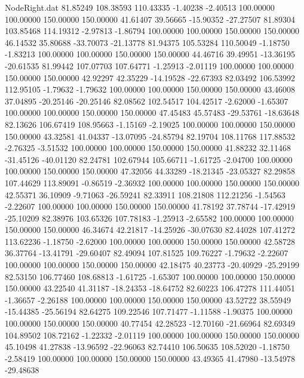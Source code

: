 \begin{filecontents}{NodeRight.dat}
  81.85249  108.38593  110.43335    -1.40238   -2.40513  100.00000  100.00000  150.00000  150.00000   41.61407   39.56665  -15.90352  -27.27507
  81.89304  103.85468  114.19312    -2.97813   -1.86794  100.00000  100.00000  150.00000  150.00000   46.14532   35.80688  -33.70073  -21.13778
  81.94375  105.53284  110.50049    -1.18750   -1.83213  100.00000  100.00000  150.00000  150.00000   44.46716   39.49951  -13.36195  -20.61535
  81.99442  107.07703  107.64771    -1.25913   -2.01119  100.00000  100.00000  150.00000  150.00000   42.92297   42.35229  -14.19528  -22.67393
  82.03492  106.53992  112.95105    -1.79632   -1.79632  100.00000  100.00000  150.00000  150.00000   43.46008   37.04895  -20.25146  -20.25146
  82.08562  102.54517  104.42517    -2.62000   -1.65307  100.00000  100.00000  150.00000  150.00000   47.45483   45.57483  -29.53761  -18.63648
  82.13626  106.67419  108.95663    -1.15169   -2.19025  100.00000  100.00000  150.00000  150.00000   43.32581   41.04337  -13.07095  -24.85794
  82.19704  108.11768  117.88532    -2.76325   -3.51532  100.00000  100.00000  150.00000  150.00000   41.88232   32.11468  -31.45126  -40.01120
  82.24781  102.67944  105.66711    -1.61725   -2.04700  100.00000  100.00000  150.00000  150.00000   47.32056   44.33289  -18.21345  -23.05327
  82.29858  107.44629  113.89091    -0.86519   -2.36932  100.00000  100.00000  150.00000  150.00000   42.55371   36.10909   -9.71063  -26.59241
  82.33911  108.21808  112.21256    -1.54563   -2.22607  100.00000  100.00000  150.00000  150.00000   41.78192   37.78744  -17.42919  -25.10209
  82.38976  103.65326  107.78183    -1.25913   -2.65582  100.00000  100.00000  150.00000  150.00000   46.34674   42.21817  -14.25926  -30.07630
  82.44028  107.41272  113.62236    -1.18750   -2.62000  100.00000  100.00000  150.00000  150.00000   42.58728   36.37764  -13.41791  -29.60407
  82.49094  107.81525  109.76227    -1.79632   -2.22607  100.00000  100.00000  150.00000  150.00000   42.18475   40.23773  -20.40929  -25.29199
  82.53150  106.77460  108.68813    -1.61725   -1.65307  100.00000  100.00000  150.00000  150.00000   43.22540   41.31187  -18.24353  -18.64752
  82.60223  106.47278  111.44051    -1.36657   -2.26188  100.00000  100.00000  150.00000  150.00000   43.52722   38.55949  -15.44385  -25.56194
  82.64275  109.22546  107.71477    -1.11588   -1.90375  100.00000  100.00000  150.00000  150.00000   40.77454   42.28523  -12.70160  -21.66964
  82.69349  104.89502  108.72162    -1.22332   -2.01119  100.00000  100.00000  150.00000  150.00000   45.10498   41.27838  -13.96592  -22.96063
  82.74410  106.50635  108.52020    -1.18750   -2.58419  100.00000  100.00000  150.00000  150.00000   43.49365   41.47980  -13.54978  -29.48638

\end{filecontents}

